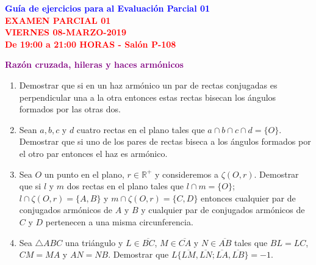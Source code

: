 \documentclass[12pt]{report}
\numberwithin{section}{chapter}
\newcommand{\R}{\mathbb R}
\begin{document}
\begin{center}
\textcolor{blue}{\textbf{\large Guía de ejercicios para al Evaluación
Parcial 01}}\\
\vspace{0.5 cm}
\textcolor{red}{\textbf{\large EXAMEN PARCIAL 01 \\ VIERNES
08-MARZO-2019\\ De 19:00 a 21:00 HORAS - Salón P-108}}
\end{center}


\begin{center}
\textcolor{purple}{\textbf{\large Razón cruzada, hileras  y haces armónicos}}
\end{center}

\begin{enumerate}

\item Demostrar que si en un haz armónico un par de rectas conjugadas es perpendicular una a la otra entonces estas rectas bisecan los ángulos formados por las otras dos.

\item Sean $a,b,c$ y $d$ cuatro rectas en el plano tales que $a\cap b \cap c \cap d =\{O\}$. Demostrar que si uno de los pares de rectas biseca a los ángulos formados por el otro par entonces el haz es armónico.

\item Sea $O$ un punto en el plano, $r \in \R^+$ y consideremos a $\zeta (O,r)$. Demostrar que si $l$ y $m$ dos rectas en el plano tales que $l \cap m = \{O\}$; $l \cap \zeta(O,r) = \{A,B\}$ y $m \cap \zeta(O,r) = \{C,D\}$ entonces cualquier par de conjugados armónicos de $A$ y $B$ y cualquier par de conjugados armónicos de $C$ y $D$ pertenecen a una misma circunferencia.


\item Sea $\triangle ABC$ una triángulo y $L \in \overline{BC}$, $M \in \overline{CA}$ y $N \in \overline{AB}$ tales que $BL=LC$, $CM=MA$ y $AN=NB$. Demostrar que $L\{\overline{LM},\overline{LN};\overline{LA},\overline{LB}\}=-1$.



\end{enumerate}
\end{document}
